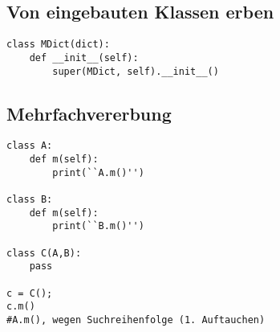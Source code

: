 \subsection{Von eingebauten Klassen erben}
\begin{lstlisting}
class MDict(dict):
    def __init__(self):
        super(MDict, self).__init__()
\end{lstlisting}
\subsection{Mehrfachvererbung}
\begin{lstlisting}
class A:
    def m(self):
        print(``A.m()'')

class B:
    def m(self):
        print(``B.m()'')

class C(A,B):
    pass
    
c = C();
c.m()
#A.m(), wegen Suchreihenfolge (1. Auftauchen)
\end{lstlisting}




